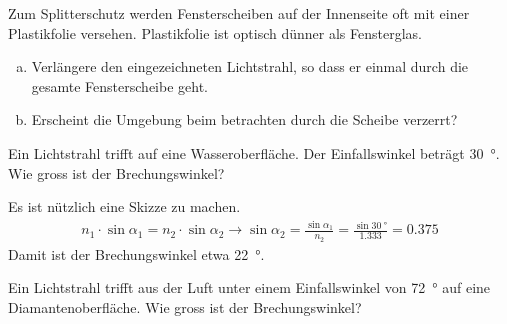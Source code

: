 \documentclass[12pt,a4paper,twoside]{article}
\begin{document}
\begin{minipage}{0.5\textwidth}
\begin{aufgabe}
	Zum Splitterschutz werden Fensterscheiben auf der Innenseite oft mit einer Plastikfolie versehen.
	Plastikfolie ist optisch dünner als Fensterglas.
	\begin{enumerate} [a)]
		\item Verlängere den eingezeichneten Lichtstrahl, so dass er einmal durch die gesamte Fensterscheibe geht.
		\item Erscheint die Umgebung beim betrachten durch die Scheibe verzerrt?
	\end{enumerate}
\end{aufgabe}
\end{minipage}
\begin{minipage}{0.5\textwidth}
	\begin{center}
	\end{center}
\end{minipage}

\begin{aufgabe}
	Ein Lichtstrahl trifft auf eine Wasseroberfläche. Der Einfallswinkel beträgt \SI{30}{\degree}. Wie gross ist der Brechungswinkel?
	\begin{loesung}
		Es ist nützlich eine Skizze zu machen.
		\begin{eqnarray*}
			n_1\cdot\sin\alpha_1 = n_2\cdot\sin\alpha_2 \to \sin\alpha_2=\frac{\sin\alpha_1}{n_2}=\frac{\sin\SI{30}{\degree}}{\num{1.333}}=\num{0.375}
		\end{eqnarray*}
		Damit ist der Brechungswinkel etwa \SI{22}{\degree}.
	\end{loesung}
\end{aufgabe}

\begin{aufgabe}
	Ein Lichtstrahl trifft aus der Luft unter einem Einfallswinkel von \SI{72}{\degree} auf eine Diamantenoberfläche.
	Wie gross ist der Brechungswinkel?
\end{aufgabe}
\end{document}
